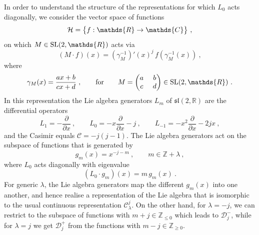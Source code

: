 \documentclass[12pt,a4paper]{article}
\newcommand{\be}{\begin{equation}}
\newcommand{\ee}{\end{equation}}
\begin{document}
In order to understand the structure of the representations for which $L_0$ acts diagonally, we consider the 
vector space of functions 
\be\label{Hdef}
{\cal H} = \bigl\{f:\mathds{R} \to \mathds{C} \bigr\} \ , 
\ee
on which $M\in {\rm SL}(2,\mathds{R})$ acts via 
\be \label{Mact}
(M \cdot f)(x)=(\gamma_M^{-1})'(x)^{j} \, f(\gamma_M^{-1}(x))\ ,
\ee
where 
\be
\gamma_M(x) = \frac{ax+b}{cx+d} \ , \qquad \hbox{for} \qquad
M = \begin{pmatrix} a \ &  b \cr c\ & d \end{pmatrix} \in {\rm SL}(2,\mathds{R}) \ . 
\ee
In this representation the Lie algebra generators $L_m$ of $\mathfrak{sl}(2,\mathds{R})$ are the differential operators
\be
L_1=-\frac{\partial}{\partial x}\ , \qquad L_0= -x \frac{\partial}{\partial x}-j\ , \qquad
L_{-1}=-x^2 \frac{\partial}{\partial x}-2jx\ ,
\ee
and the Casimir equals $\mathcal{C}=-j(j-1)$. The Lie algebra generators act on the subspace of functions that is generated by 
\be
g_m(x) = x^{-j -m} \ , \qquad m\in\mathds{Z} +\lambda \ ,
\ee
where $L_0$ acts diagonally with eigenvalue
\be
(L_0 \cdot g_m)(x) = m\, g_m(x) \ .
\ee
For generic $\lambda$, the Lie algebra generators map the different $g_m(x)$ into one another, and hence realise a representation of the Lie algebra that is isomorphic to the usual continuous representation $\mathscr{C}^j_\lambda$. On the other hand, for $\lambda=-j$, we can restrict to the subspace of functions with $m+j \in \mathds{Z}_{\le 0}$ which leads to $\mathscr{D}^-_j$, while for $\lambda=j$ we get $\mathscr{D}^+_j$ from the functions with $m-j\in \mathds{Z}_{\ge 0}$. 
\end{document}
